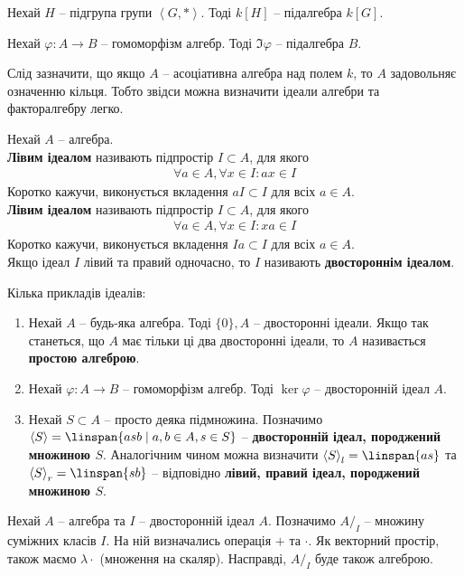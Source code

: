 \documentclass{math_library}
\begin{document}
\begin{example}
Нехай $H$ -- підгрупа групи $\left<G,*\right>$. Тоді $k[H]$ -- підалгебра $k[G]$.
\end{example}

\begin{example}
Нехай $\varphi \colon A \to B$ -- гомоморфізм алгебр. Тоді $\Im \varphi$ -- підалгебра $B$.
\end{example}

\begin{remark}
Слід зазначити, що якщо $A$ -- асоціативна алгебра над полем $k$, то $A$ задовольняє означенню кільця. Тобто звідси можна визначити ідеали алгебри та факторалгебру легко.
\end{remark}

\begin{definition}
Нехай $A$ -- алгебра.\\
\textbf{Лівим ідеалом} називають підпростір $I \subset A$, для якого
\begin{align*}
\forall a \in A, \forall x \in I: ax \in I
\end{align*}
Коротко кажучи, виконується вкладення $aI \subset I$ для всіх $a \in A$.\\
\textbf{Лівим ідеалом} називають підпростір $I \subset A$, для якого
\begin{align*}
\forall a \in A, \forall x \in I: xa \in I
\end{align*}
Коротко кажучи, виконується вкладення $Ia \subset I$ для всіх $a \in A$.\\
Якщо ідеал $I$ лівий та правий одночасно, то $I$ називають \textbf{двостороннім ідеалом}.
\end{definition}

\begin{example}
Кілька прикладів ідеалів:
\begin{enumerate}[nosep,wide=0pt,label={\arabic*)}]
\item Нехай $A$ -- будь-яка алгебра. Тоді $\{0\}, A$ -- двосторонні ідеали. Якщо так станеться, що $A$ має тільки ці два двосторонні ідеали, то $A$ називається \textbf{простою алгеброю}.
\item Нехай $\varphi \colon A \to B$ -- гомоморфізм алгебр. Тоді $\ker \varphi$ -- двосторонній ідеал $A$.
\item Нехай $S \subset A$ -- просто деяка підмножина. Позначимо $\left<S\right> = \linspan\{asb \mid a,b \in A, s \in S\}$ --  \textbf{двосторонній ідеал, породжений множиною $S$}. Аналогічним чином можна визначити $\left<S\right>_l = \linspan\{as\}$ та $\left<S\right>_r = \linspan\{sb\}$ -- відповідно \textbf{лівий, правий ідеал, породжений множиною $S$}.
\end{enumerate}
\end{example}
\noindent
Нехай $A$ -- алгебра та $I$ -- двосторонній ідеал $A$. Позначимо $A/_I$ -- множину суміжних класів $I$. На ній визначались операція $+$ та $\cdot$. Як векторний простір, також маємо $\lambda \cdot$ (множення на скаляр). Насправді, $A/_I$ буде також алгеброю.
\end{document}
